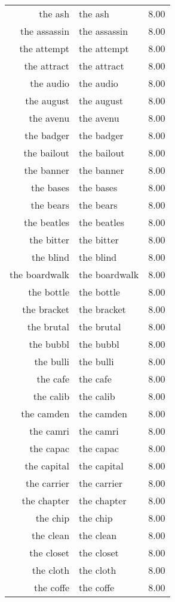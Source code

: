 \begin{table}[ht]
\begin{tabular}{rlr}
  the ash & the ash & 8.00 \\ 
  the assassin & the assassin & 8.00 \\ 
  the attempt & the attempt & 8.00 \\ 
  the attract & the attract & 8.00 \\ 
  the audio & the audio & 8.00 \\ 
  the august & the august & 8.00 \\ 
  the avenu & the avenu & 8.00 \\ 
  the badger & the badger & 8.00 \\ 
  the bailout & the bailout & 8.00 \\ 
  the banner & the banner & 8.00 \\ 
  the bases & the bases & 8.00 \\ 
  the bears & the bears & 8.00 \\ 
  the beatles & the beatles & 8.00 \\ 
  the bitter & the bitter & 8.00 \\ 
  the blind & the blind & 8.00 \\ 
  the boardwalk & the boardwalk & 8.00 \\ 
  the bottle & the bottle & 8.00 \\ 
  the bracket & the bracket & 8.00 \\ 
  the brutal & the brutal & 8.00 \\ 
  the bubbl & the bubbl & 8.00 \\ 
  the bulli & the bulli & 8.00 \\ 
  the cafe & the cafe & 8.00 \\ 
  the calib & the calib & 8.00 \\ 
  the camden & the camden & 8.00 \\ 
  the camri & the camri & 8.00 \\ 
  the capac & the capac & 8.00 \\ 
  the capital & the capital & 8.00 \\ 
  the carrier & the carrier & 8.00 \\ 
  the chapter & the chapter & 8.00 \\ 
  the chip & the chip & 8.00 \\ 
  the clean & the clean & 8.00 \\ 
  the closet & the closet & 8.00 \\ 
  the cloth & the cloth & 8.00 \\ 
  the coffe & the coffe & 8.00 \\ 

\end{tabular}
\end{table}

